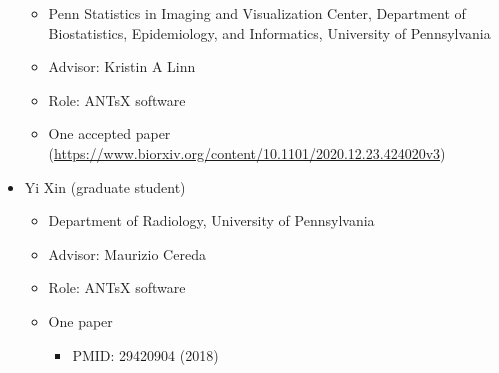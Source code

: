 \documentclass[
  11pt,
]{article}
\providecommand{\tightlist}{%
  \setlength{\itemsep}{0pt}\setlength{\parskip}{0pt}}
\begin{document}
\begin{itemize}
  \begin{itemize}
  \tightlist
  \item
    Penn Statistics in Imaging and Visualization Center, Department of
    Biostatistics, Epidemiology, and Informatics, University of
    Pennsylvania
  \item
    Advisor: Kristin A Linn
  \item
    Role: ANTsX software
  \item
    One accepted paper
    (\url{https://www.biorxiv.org/content/10.1101/2020.12.23.424020v3})
  \end{itemize}
\item
  Yi Xin (graduate student)

  \begin{itemize}
  \tightlist
  \item
    Department of Radiology, University of Pennsylvania
  \item
    Advisor: Maurizio Cereda
  \item
    Role: ANTsX software
  \item
    One paper

    \begin{itemize}
    \tightlist
    \item
      PMID: 29420904 (2018)
    \end{itemize}
  \end{itemize}
\end{itemize}
\end{document}
